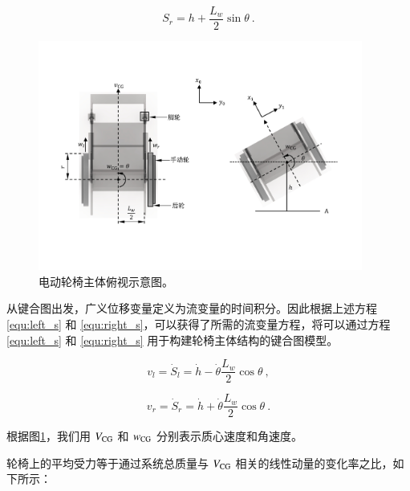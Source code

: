 	\begin{equation}
	\label{equ:right_s}
	S_r = h
	+
	\frac{L_w}{2} \sin \theta
	\ .
	\end{equation}
	
	\begin{figure}[!t]
		\centering
		\includegraphics[width=0.95\textwidth]{fig/top_view.pdf}
		\caption{电动轮椅主体俯视示意图。}\label{fig:top_view}
	\end{figure}
	
	从键合图出发，广义位移变量定义为流变量的时间积分。因此根据上述方程 \ref{equ:left_s} 和 \ref{equ:right_s}，可以获得了所需的流变量方程，将可以通过方程 \ref{equ:left_s} 和 \ref{equ:right_s} 用于构建轮椅主体结构的键合图模型。
	
	\begin{equation}
	\label{equ:left_v}
	v_{l}
	=
	\dot{S}_{l}
	=
	\dot{h}
	-
	\dot{\theta} \frac{L_w}{2} \cos \theta
	\ ,
	\end{equation}
	
	\begin{equation}
	\label{equ:right_v}
	v_{r}
	=
	\dot{S}_{r}
	=
	\dot{h}
	+
	\dot{\theta} \frac{L_w}{2} \cos \theta
	\ .
	\end{equation}
	
	根据图\ref{fig:top_view}，我们用 $ V_{\rm{CG}} $ 和 $ w_{\rm{CG}} $ 分别表示质心速度和角速度。
	
	轮椅上的平均受力等于通过系统总质量与 $ V_{\rm{CG}} $ 相关的线性动量的变化率之比，如下所示：
	

